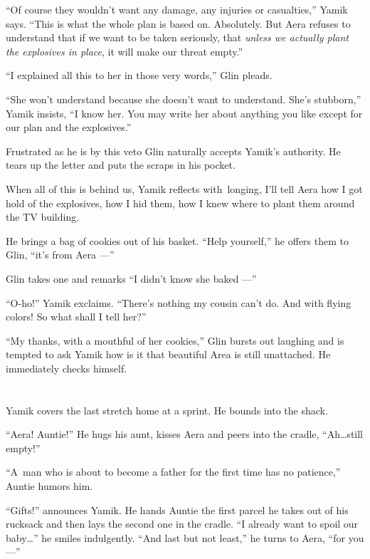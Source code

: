 \documentclass[twoside,11pt]{book}
\begin{document}
``Of course they wouldn't want any damage, any injuries or casualties,'' Yamik says.
``This is what the whole plan is based on. Absolutely. But Aera refuses to understand that if we want to
be taken seriously, that \textit{unless we actually plant the explosives in place}, it
will make our threat empty.''

``I explained all this to her in those very words,'' Glin pleads.

``She won't understand because she doesn't want to understand. She's stubborn,'' Yamik insists, ``I know
her. You may write her about anything you like except for our plan and the explosives.''

Frustrated as he is by this veto Glin naturally accepts Yamik's authority. He tears up the letter and puts the scraps in
his pocket.

When all of this is behind us, Yamik reflects with~longing, I'll tell Aera how I got hold of the explosives, how I hid
them, how I knew where to plant them around the TV building.

He brings a bag of cookies out of his basket. ``Help yourself,'' he offers them to Glin,
``it's from Aera ---''

Glin takes one and remarks ``I didn't know she baked ---''

``O-ho!'' Yamik exclaims. ``There's nothing my cousin can't do. And with flying
colors! So what shall I tell her?''

``My thanks, with a mouthful of her cookies,'' Glin bursts out
laughing and is tempted to ask
Yamik how is it that beautiful Area is still unattached. He immediately checks himself.



\chapter{}

Yamik covers the last stretch home at a sprint. He bounds into the shack.

``Aera! Auntie!'' He hugs his aunt, kisses Aera and peers into the cradle,
``Ah{\ldots}still empty!''

``A~man who is about to become a father for the first time has no patience,'' Auntie humors
him.

``Gifts!'' announces Yamik. He hands Auntie the first parcel he takes out of his rucksack and
then lays the second one in the cradle. ``I already want to spoil our baby{\ldots}'' he smiles indulgently.
``And last but not least,'' he turns to Aera, ``for you ---''
\end{document}
